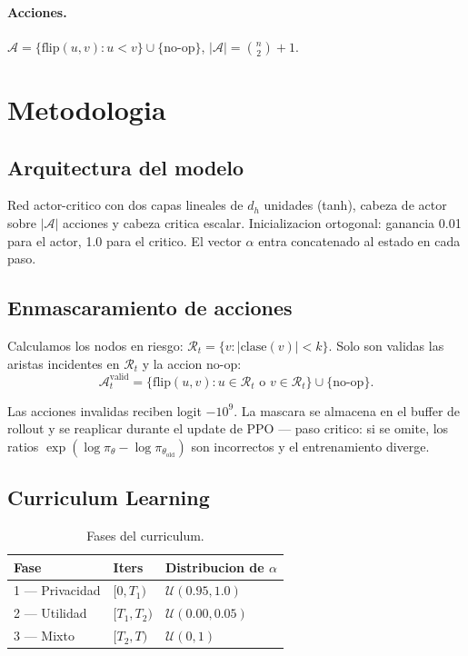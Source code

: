 \documentclass[10pt,twocolumn,letterpaper]{article}
\begin{document}
\paragraph{Acciones.}
$\mathcal{A} = \{\text{flip}(u,v): u\!<\!v\}\cup\{\text{no-op}\}$,
$|\mathcal{A}| = \binom{n}{2}+1$.

\section{Metodologia}

\subsection{Arquitectura del modelo}

Red actor-critico con dos capas lineales de $d_h$ unidades (tanh), cabeza de actor
sobre $|\mathcal{A}|$ acciones y cabeza critica escalar. Inicializacion ortogonal:
ganancia 0.01 para el actor, 1.0 para el critico. El vector $\alpha$ entra concatenado
al estado en cada paso.

\subsection{Enmascaramiento de acciones}

Calculamos los nodos en riesgo:
$\mathcal{R}_t = \{v : |\text{clase}(v)| < k\}$.
Solo son validas las aristas incidentes en $\mathcal{R}_t$ y la accion no-op:
\begin{equation}
  \mathcal{A}_t^{\text{valid}} =
    \{\text{flip}(u,v): u{\in}\mathcal{R}_t \text{ o } v{\in}\mathcal{R}_t\}
    \cup \{\text{no-op}\}.
\end{equation}

Las acciones invalidas reciben logit $-10^9$. La mascara se almacena en el buffer de
rollout y se reaplicar durante el update de PPO --- paso critico: si se omite, los
ratios $\exp(\log\pi_\theta - \log\pi_{\theta_\text{old}})$ son incorrectos y el
entrenamiento diverge.

\subsection{Curriculum Learning}

\begin{table}[h]
\centering\small
\caption{Fases del curriculum.}
\label{tab:curriculum}
\begin{tabular}{lll}
\toprule
Fase & Iters & Distribucion de $\alpha$ \\
\midrule
1 — Privacidad & $[0, T_1)$   & $\mathcal{U}(0.95, 1.0)$ \\
2 — Utilidad   & $[T_1, T_2)$ & $\mathcal{U}(0.00, 0.05)$ \\
3 — Mixto      & $[T_2, T)$   & $\mathcal{U}(0, 1)$ \\
\bottomrule
\end{tabular}
\end{table}
\end{document}
